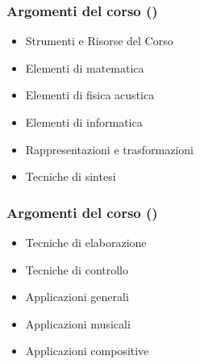 %
%
%
%
%

\setcounter{ms}{0}
\begin{frame}
    \frametitle{Argomenti del corso ()}

	\begin{itemize}[<+- | alert@+->]

		\item Strumenti e Risorse del Corso

		\item Elementi di matematica

		\item Elementi di fisica acustica

		\item Elementi di informatica

		\item Rappresentazioni e trasformazioni

		\item Tecniche di sintesi

	\end{itemize}

\end{frame}

\begin{frame}
    \frametitle{Argomenti del corso ()}

	\begin{itemize}[<+- | alert@+->]

		\item Tecniche di elaborazione

		\item Tecniche di controllo

		\item Applicazioni generali

		\item Applicazioni musicali

		\item Applicazioni compositive

	\end{itemize}

\end{frame}
